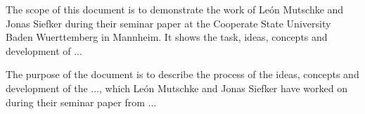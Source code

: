 

	The scope of this document is to demonstrate the work of León Mutschke and Jonas Siefker during their seminar paper at the Cooperate State University Baden Wuerttemberg in Mannheim. It shows the task, ideas, concepts and development of ...	%

	The purpose of the document is to describe the process of the ideas, concepts and development of the ..., which León Mutschke and Jonas Siefker have worked on during their seminar paper from ... %